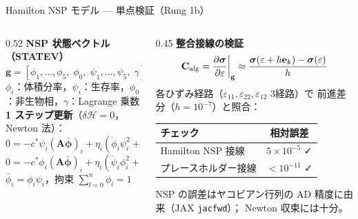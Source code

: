 \documentclass[
  ignorenonframetext,
  aspectratio=169,
]{beamer}
\begin{document}
\begin{frame}{Hamilton NSP モデル --- 単点検証（Rung 1b）}
\protect\hypertarget{rung1b-nsp}{}

\begin{columns}[T]
\begin{column}{0.52\textwidth}
\textbf{NSP 状態ベクトル（STATEV）}\\[2pt]
$\mathbf{g} = [\phi_1,\ldots,\phi_5,\;\phi_0,\;\psi_1,\ldots,\psi_5,\;\gamma]^\top \in \mathbb{R}^{12}$\\[4pt]
$\phi_i$：体積分率，$\psi_i$：生存率，$\phi_0$：非生物相，$\gamma$：Lagrange 乗数\\[6pt]

\textbf{1 ステップ更新}（$\delta\mathcal{H}=0$，Newton 法）：
\[
0 = -c^*\psi_i(\mathbf{A}\bar{\boldsymbol\phi})_i
  + \eta_i(\dot\phi_i\psi_i^2 + \bar\phi_i\dot\psi_i + \dot\phi_i) + \gamma
\]
\[
0 = -c^*\phi_i(\mathbf{A}\bar{\boldsymbol\phi})_i
  + \eta_i(\dot\psi_i\phi_i^2 + \bar\phi_i\dot\phi_i)
\]
$\bar\phi_i = \phi_i\psi_i$，拘束 $\sum_{l=0}^{n}\phi_l=1$

\end{column}
\begin{column}{0.45\textwidth}
\textbf{整合接線の検証}\\[4pt]
{\small
\[
\mathbf{C}_{\rm alg} = \frac{\partial \boldsymbol\sigma}{\partial \varepsilon}\bigg|_{\mathbf{g}}
\approx \frac{\boldsymbol\sigma(\varepsilon+h\mathbf{e}_k) - \boldsymbol\sigma(\varepsilon)}{h}
\]
}
各ひずみ経路（$\varepsilon_{11},\varepsilon_{22},\varepsilon_{12}$ 3経路）で
前進差分（$h=10^{-7}$）と照合：

\vspace{4pt}
\begin{center}
\begin{tabular}{@{}lc@{}}
\toprule
チェック & 相対誤差\\
\midrule
Hamilton NSP 接線 & $5\times10^{-5}$ ✓\\
プレースホルダー接線 & $<10^{-11}$ ✓\\
\bottomrule
\end{tabular}
\end{center}

\vspace{4pt}
{\footnotesize
NSP の誤差はヤコビアン行列の AD 精度に由来（JAX \texttt{jacfwd}）；
Newton 収束には十分。}
\end{column}
\end{columns}
\end{frame}
\end{document}
